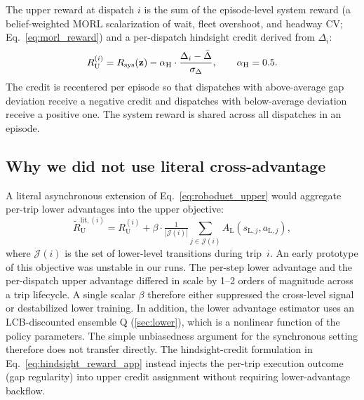 The upper reward at dispatch $i$ is the sum of the episode-level system reward (a belief-weighted MORL scalarization of wait, fleet overshoot, and headway CV; Eq.~\ref{eq:morl_reward}) and a per-dispatch hindsight credit derived from $\Delta_i$:
\begin{equation}
  R_{\mathrm{U}}^{(i)} = R_{\mathrm{sys}}(\mathbf{z}) - \alpha_{\mathrm{H}} \cdot \frac{\Delta_i - \bar{\Delta}}{\sigma_{\Delta}}, \qquad \alpha_{\mathrm{H}} = 0.5.
  \label{eq:hindsight_reward_app}
\end{equation}
The credit is recentered per episode so that dispatches with above-average gap deviation receive a negative credit and dispatches with below-average deviation receive a positive one. The system reward is shared across all dispatches in an episode.

\subsection{Why we did not use literal cross-advantage}

A literal asynchronous extension of Eq.~\eqref{eq:roboduet_upper} would aggregate per-trip lower advantages into the upper objective:
\begin{equation}
  \tilde{R}^{\text{lit},(i)}_{\mathrm{U}} = R_{\mathrm{U}}^{(i)} + \beta \cdot \tfrac{1}{|\mathcal{J}(i)|}\sum_{j \in \mathcal{J}(i)} A_{\mathrm{L}}(s_{\mathrm{L},j}, a_{\mathrm{L},j}),
  \label{eq:cross_adv_literal}
\end{equation}
where $\mathcal{J}(i)$ is the set of lower-level transitions during trip~$i$. An early prototype of this objective was unstable in our runs. The per-step lower advantage and the per-dispatch upper advantage differed in scale by 1--2 orders of magnitude across a trip lifecycle. A single scalar $\beta$ therefore either suppressed the cross-level signal or destabilized lower training. In addition, the lower advantage estimator uses an LCB-discounted ensemble Q (\cref{sec:lower}), which is a nonlinear function of the policy parameters. The simple unbiasedness argument for the synchronous setting therefore does not transfer directly. The hindsight-credit formulation in Eq.~\eqref{eq:hindsight_reward_app} instead injects the per-trip execution outcome (gap regularity) into upper credit assignment without requiring lower-advantage backflow.

